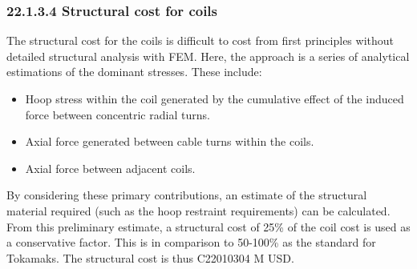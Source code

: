 \subsubsection*{22.1.3.4 Structural cost for coils}

The structural cost for the coils is difficult to cost from first principles without detailed structural analysis with FEM. Here, the approach is a series of analytical estimations of the dominant stresses. These include:

\begin{itemize}
    \item Hoop stress within the coil generated by the cumulative effect of the induced force between concentric radial turns.
    \item Axial force generated between cable turns within the coils. 
    \item Axial force between adjacent coils.
\end{itemize}


By considering these primary contributions, an estimate of the structural material required (such as the hoop restraint requirements) can be calculated. From this preliminary estimate, a structural cost of 25\% of the coil cost is used as a conservative factor. This is in comparison to 50-100\% as the standard for Tokamaks. The structural cost is thus C22010304 M USD.


